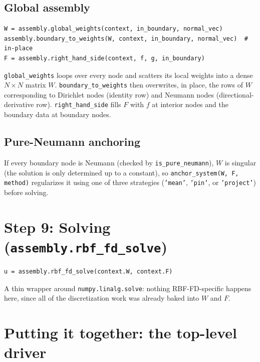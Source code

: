 \documentclass[11pt]{article}
\begin{document}
\subsection{Global assembly}

\begin{lstlisting}
W = assembly.global_weights(context, in_boundary, normal_vec)
assembly.boundary_to_weights(W, context, in_boundary, normal_vec)  # in-place
F = assembly.right_hand_side(context, f, g, in_boundary)
\end{lstlisting}

\texttt{global\_weights} loops over every node and scatters its local
weights into a dense $N\times N$ matrix $W$. \texttt{boundary\_to\_weights}
then overwrites, in place, the rows of $W$ corresponding to Dirichlet
nodes (identity row) and Neumann nodes (directional-derivative row).
\texttt{right\_hand\_side} fills $F$ with $f$ at interior nodes and the
boundary data at boundary nodes.

\subsection{Pure-Neumann anchoring}

If every boundary node is Neumann (checked by
\texttt{is\_pure\_neumann}), $W$ is singular (the solution is only
determined up to a constant), so \texttt{anchor\_system(W, F, method)}
regularizes it using one of three strategies (\texttt{'mean'},
\texttt{'pin'}, or \texttt{'project'}) before solving.

\section{Step 9: Solving (\texttt{assembly.rbf\_fd\_solve})}

\begin{lstlisting}
u = assembly.rbf_fd_solve(context.W, context.F)
\end{lstlisting}
A thin wrapper around \texttt{numpy.linalg.solve}: nothing
RBF-FD-specific happens here, since all of the discretization work was
already baked into $W$ and $F$.

\section{Putting it together: the top-level driver}
\end{document}
